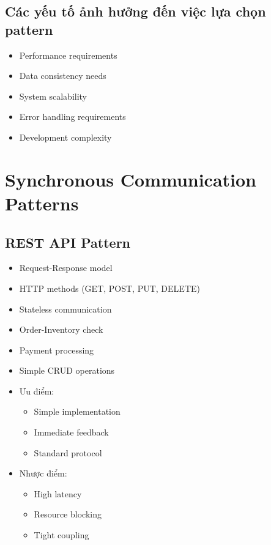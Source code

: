 \subsection{Các yếu tố ảnh hưởng đến việc lựa chọn pattern}
\begin{itemize}
    \item Performance requirements
    \item Data consistency needs
    \item System scalability
    \item Error handling requirements
    \item Development complexity
\end{itemize}

\section{Synchronous Communication Patterns}
\subsection{REST API Pattern}
\begin{itemize}
    \item Request-Response model
    \item HTTP methods (GET, POST, PUT, DELETE)
    \item Stateless communication
\end{itemize}

\begin{itemize}
    \item Order-Inventory check
    \item Payment processing
    \item Simple CRUD operations
\end{itemize}

\begin{itemize}
    \item Ưu điểm:
    \begin{itemize}
        \item Simple implementation
        \item Immediate feedback
        \item Standard protocol
    \end{itemize}
    \item Nhược điểm:
    \begin{itemize}
        \item High latency
        \item Resource blocking
        \item Tight coupling
    \end{itemize}
\end{itemize}

